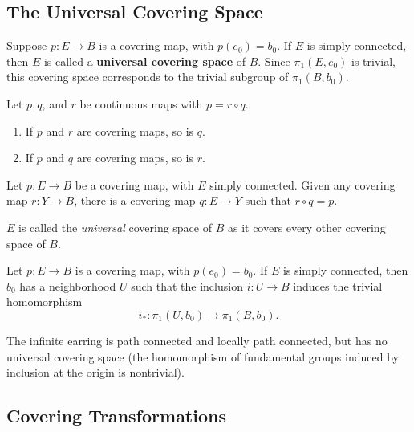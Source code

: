 \subsection{The Universal Covering Space}

\begin{definition}
Suppose $p\colon E \rightarrow B$ is a covering map, with $p(e_0) = b_0$. If $E$ is simply connected, then $E$ is called a \textbf{universal covering space} of $B$.
Since $\pi_1(E, e_0)$ is trivial, this covering space corresponds to the trivial subgroup of $\pi_1(B, b_0)$.
\end{definition}

\begin{lemma}
Let $p, q$, and $r$ be continuous maps with $p = r \circ q$. 
\begin{enumerate}
    \item If $p$ and $r$ are covering maps, so is $q$.
    \item If $p$ and $q$ are covering maps, so is $r$.
\end{enumerate}
\end{lemma}

\begin{theorem}
Let $p\colon E \rightarrow B$ be a covering map, with $E$ simply connected. Given any covering map $r\colon Y \rightarrow B$, there is a covering map
$q\colon E \rightarrow Y$ such that $r \circ q = p$.
\end{theorem}

\begin{remark}
$E$ is called the \textit{universal} covering space of $B$ as it covers every other covering space of $B$.
\end{remark}

\begin{lemma}
Let $p\colon E \rightarrow B$ is a covering map, with $p(e_0) = b_0$. If $E$ is simply connected, then $b_0$ has a neighborhood $U$ such that the inclusion
$i \colon U \rightarrow B$ induces the trivial homomorphism
\[
    i_{\ast} \colon \pi_1(U, b_0) \rightarrow \pi_1(B, b_0).
\]
\end{lemma}

\begin{remark}
The infinite earring is path connected and locally path connected, but has no universal covering space (the homomorphism of fundamental groups induced by inclusion at the origin is nontrivial).
\end{remark}

\subsection{Covering Transformations}

